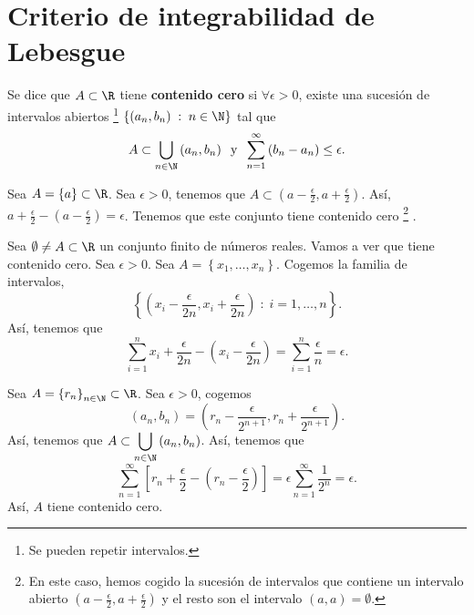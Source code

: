 \section{Criterio de integrabilidad de Lebesgue}
\begin{fdefinition}
	\normalfont Se dice que $\displaystyle A \subset \R $ tiene \textbf{contenido cero} si $\displaystyle \forall \epsilon > 0 $, existe una sucesión de intervalos abiertos \footnote{Se pueden repetir intervalos.} $\displaystyle \left\{ \left(a_{n}, b_{n}\right) \; : \; n \in \N\right\}  $ tal que 
	\[  A \subset \bigcup_{n \in \N}\left(a_{n}, b_{n}\right)  \;\; \text{y} \;\;  \sum^{\infty}_{n=1}\left(b_{n}-a_{n}\right) \leq \epsilon.\]
\end{fdefinition}
\begin{eg}
	\normalfont Sea $\displaystyle A = \left\{ a\right\} \subset \R $. Sea $\displaystyle \epsilon > 0 $, tenemos que $\displaystyle A \subset \left(a - \frac{\epsilon }{2}, a + \frac{\epsilon }{2}\right) $. Así, $\displaystyle a + \frac{\epsilon }{2}-\left(a-\frac{\epsilon }{2}\right) = \epsilon $. Tenemos que este conjunto tiene contenido cero \footnote{En este caso, hemos cogido la sucesión de intervalos que contiene un intervalo abierto $\displaystyle \left(a - \frac{\epsilon }{2}, a + \frac{\epsilon }{2}\right) $ y el resto son el intervalo $\displaystyle \left(a,a\right) = \emptyset $.} . 
\end{eg}
\begin{eg}
	\normalfont Sea $\displaystyle \emptyset \neq A \subset \R $ un conjunto finito de números reales. Vamos a ver que tiene contenido cero. Sea $\displaystyle \epsilon > 0 $. Sea $\displaystyle A = \left\{ x_{1}, \ldots, x_{n}\right\}  $. Cogemos la familia de intervalos,
	\[ \left\{ \left(x_{i}-\frac{\epsilon }{2n}, x_{i}+\frac{\epsilon }{2n}\right) \; : \; i = 1, \ldots, n\right\}  .\]
	Así, tenemos que 
\[\sum^{n}_{i=1} x_{i}+\frac{\epsilon }{2n} - \left(x_{i} - \frac{\epsilon }{2n}\right) = \sum^{n}_{i=1}\frac{\epsilon }{n} = \epsilon.\]
\end{eg}
\begin{eg}
	\normalfont Sea $\displaystyle A = \left\{ r_{n}\right\}_{n\in\N} \subset \R $. Sea $\displaystyle \epsilon > 0 $, cogemos  
	\[ \left(a_{n},b_{n}\right) = \left(r_{n}-\frac{\epsilon }{2^{n+1}}, r_{n} + \frac{\epsilon }{2^{n+1}}\right) .\]
	Así, tenemos que $\displaystyle A \subset \bigcup_{n \in \N}\left(a_{n}, b_{n}\right) $. Así, tenemos que 
	\[\sum^{\infty}_{n=1}\left[r_{n} + \frac{\epsilon }{2} - \left(r_{n}-\frac{\epsilon }{2}\right)\right] = \epsilon \sum^{\infty}_{n=1}\frac{1}{2^{n}} = \epsilon .\]
Así, $\displaystyle A $ tiene contenido cero.	
\end{eg}
